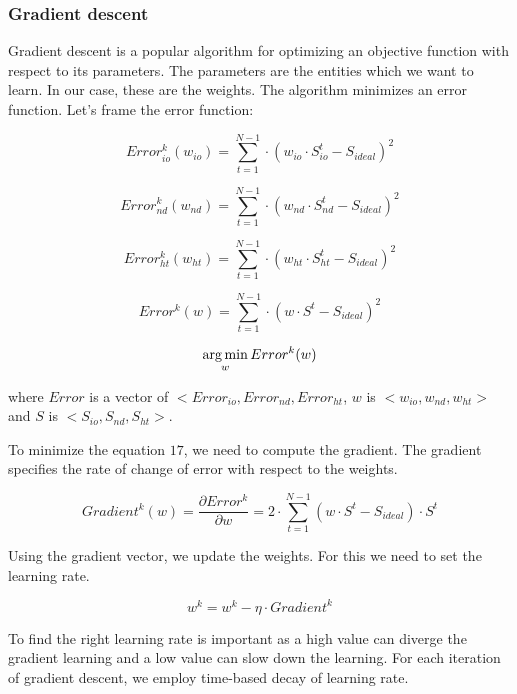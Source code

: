 \subsubsection{Gradient descent}
Gradient descent is a popular algorithm for optimizing an objective function with respect to its parameters. The parameters are the entities which we want to learn. In our case, these are the weights. The algorithm minimizes an error function. Let's frame the error function:

\begin{equation}
Error^k_{io}(w_{io}) = \sum_{t=1}^{N-1} \cdot (w_{io} \cdot S^t_{io} - S_{ideal}) ^ 2
\end{equation}

\begin{equation}
Error^k_{nd}(w_{nd}) = \sum_{t=1}^{N-1} \cdot (w_{nd} \cdot S^t_{nd} - S_{ideal}) ^ 2
\end{equation}

\begin{equation}
Error^k_{ht}(w_{ht}) = \sum_{t=1}^{N-1} \cdot (w_{ht} \cdot S^t_{ht} - S_{ideal}) ^ 2
\end{equation}

\begin{equation}
Error^k(w) = \sum_{t=1}^{N-1} \cdot (w \cdot S^t - S_{ideal}) ^ 2
\end{equation}

\begin{equation}
\operatorname*{arg\,min}_w Error^k(w) 
\end{equation} 

where $Error$ is a vector of $<Error_{io}, Error_{nd}, Error_{ht}$,
$w$ is $<w_{io}, w_{nd}, w_{ht}>$ and $S$ is $<S_{io}, S_{nd}, S_{ht}>$.

To minimize the equation $17$, we need to compute the gradient. The gradient specifies the rate of change of error with respect to the weights.

\begin{equation}
Gradient^k(w) = \frac{\partial Error^k}{\partial w} = 2 \cdot \sum_{t=1}^{N-1} (w \cdot S^t - S_{ideal}) \cdot S^t
\end{equation}

Using the gradient vector, we update the weights. For this we need to set the learning rate.

\begin{equation}
w^k = w^k - \eta \cdot {Gradient^k}
\end{equation}

To find the right learning rate is important as a high value can diverge the gradient learning and a low value can slow down the learning. For each iteration of gradient descent, we employ time-based decay of learning rate.

